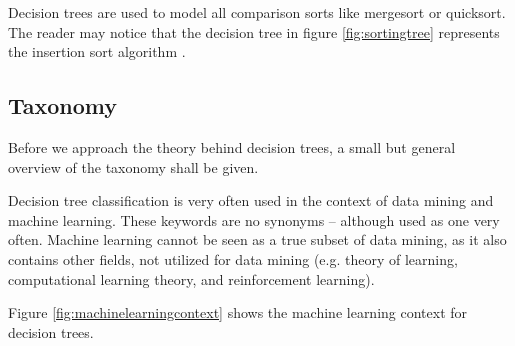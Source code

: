 \begin{remark}
    Decision trees are used to model all comparison sorts like mergesort or quicksort. The reader may notice that the decision tree in figure \ref{fig:sortingtree} represents the insertion sort algorithm \cite[p. 208]{cormen2001introduction}. 
\end{remark}




\subsection{Taxonomy}\label{taxonomy}

Before we approach the theory behind decision trees, a small but general overview of the taxonomy shall be given.

Decision tree classification is very often used in the context of data mining and machine learning. These keywords are no synonyms -- although used as one very often. Machine learning cannot be seen as a true subset of data mining, as it also contains other fields, not utilized for data mining (e.g. theory of learning, computational learning theory, and reinforcement learning).

Figure \ref{fig:machinelearningcontext} shows the machine learning context for decision trees. 

